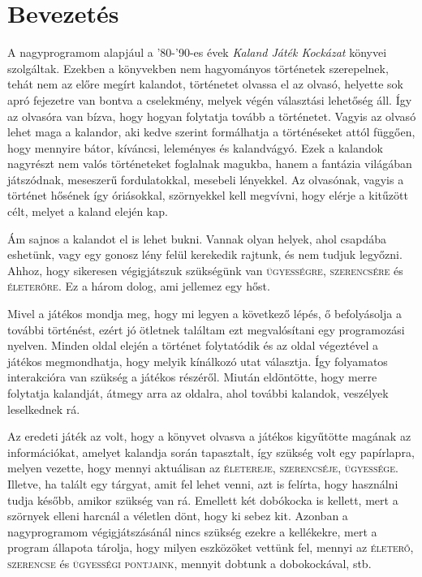 \documentclass[12pt,a4paper,oneside]{report}
\newcommand{\stat}{\textsc}
\begin{document}

\tableofcontents

\newcommand{\chap}[1]{
  \addcontentsline{toc}{chapter}{#1}
  \addtocounter{chapter}{1}
  \chapter*{#1}
}

\chapter*{Bevezetés}

  A nagyprogramom alapjául a '80-'90-es évek \emph{Kaland Játék Kockázat}
  könyvei szolgáltak. Ezekben a könyvekben nem hagyományos történetek
  szerepelnek, tehát nem az előre megírt kalandot, történetet olvassa el
  az olvasó, helyette sok apró fejezetre van bontva a cselekmény, melyek
  végén választási lehetőség áll. Így az olvasóra van bízva, hogy hogyan
  folytatja tovább a történetet. Vagyis az olvasó lehet maga a kalandor,
  aki kedve szerint formálhatja a történéseket attól függően, hogy
  mennyire bátor, kíváncsi, leleményes és kalandvágyó. Ezek a kalandok
  nagyrészt nem valós történeteket foglalnak magukba, hanem a fantázia
  világában játszódnak, meseszerű fordulatokkal, mesebeli lényekkel. Az
  olvasónak, vagyis a történet hősének így óriásokkal, szörnyekkel kell
  megvívni, hogy elérje a kitűzött célt, melyet a kaland elején kap.
  
  Ám sajnos a kalandot el is lehet bukni. Vannak olyan helyek, ahol
  csapdába eshetünk, vagy egy gonosz lény felül kerekedik rajtunk, és
  nem tudjuk legyőzni. Ahhoz, hogy sikeresen végigjátszuk szükségünk
  van \stat{ügyességre}, \stat{szerencsére} és \stat{életerőre}. Ez a
  három dolog, ami jellemez egy hőst.

  Mivel a játékos mondja meg, hogy mi legyen a következő lépés, ő
  befolyásolja a további történést, ezért jó ötletnek találtam ezt
  megvalósítani egy programozási nyelven. Minden oldal elején a történet
  folytatódik és az oldal végeztével a játékos megmondhatja, hogy
  melyik kínálkozó utat választja. Így folyamatos interakcióra van
  szükség a játékos részéről. Miután eldöntötte, hogy merre folytatja
  kalandját, átmegy arra az oldalra, ahol további kalandok, veszélyek
  leselkednek rá.
  
  Az eredeti játék az volt, hogy a könyvet olvasva a játékos
  kigyűtötte magának az információkat, amelyet kalandja során
  tapasztalt, így szükség volt egy papírlapra, melyen vezette, hogy
  mennyi aktuálisan az \stat{életereje}, \stat{szerencséje},
  \stat{ügyessége}. Illetve, ha talált egy tárgyat, amit fel lehet
  venni, azt is felírta, hogy használni tudja később, amikor szükség
  van rá. Emellett két dobókocka is kellett, mert a szörnyek elleni
  harcnál a véletlen dönt, hogy ki sebez kit. Azonban a nagyprogramom
  végigjátszásánál nincs szükség ezekre a kellékekre, mert a program
  állapota tárolja, hogy milyen eszközöket vettünk fel, mennyi az
  \stat{életerő}, \stat{szerencse} és \stat{ügyességi pontjaink},
  mennyit dobtunk a dobokockával, stb.
  
\end{document}
